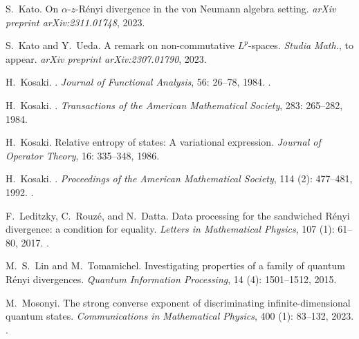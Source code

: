 \documentclass[12pt]{article}
\theoremstyle{definition}
\theoremstyle{remark}
\numberwithin{equation}{section}
\begin{document}
\begin{thebibliography}{27}
S.~Kato.
\newblock On $\alpha $-$ z $-{R}\'enyi divergence in the von {N}eumann algebra
  setting.
\newblock \emph{arXiv preprint arXiv:2311.01748}, 2023.

S.~Kato and Y.~Ueda.
\newblock A remark on non-commutative {$L^p$}-spaces.
\newblock \emph{Studia Math.}, to appear.
\newblock \emph{arXiv preprint arXiv:2307.01790}, 2023.

H.~Kosaki.
.
\newblock \emph{Journal of Functional Analysis}, {56}: 26--78,
  {1984}{}.
\newblock {}.

H.~Kosaki.
.
\newblock \emph{Transactions of the American Mathematical Society}, {283}: 265--282,
  {1984}{}.

H.~Kosaki.
\newblock Relative entropy of states: A variational expression.
\newblock \emph{Journal of Operator Theory}, 16: 335--348, 1986.

H.~Kosaki.
.
\newblock \emph{Proceedings of the American Mathematical Society}, 114
  (2): 477--481, 1992.
\newblock {}.

F.~Leditzky, C.~Rouz{\'e}, and N.~Datta.
\newblock Data processing for the sandwiched {R}{\'e}nyi divergence: a
  condition for equality.
\newblock \emph{Letters in Mathematical Physics}, 107 (1):
  61--80, 2017.
\newblock {}.

M.~S.~Lin and M.~Tomamichel.
\newblock Investigating properties of a family of quantum R\'enyi divergences.
\newblock \emph{Quantum Information Processing}, 14
 (4): 1501--1512, 2015.

M.~Mosonyi.
\newblock The strong converse exponent of discriminating infinite-dimensional
  quantum states.
\newblock \emph{Communications in Mathematical Physics}, 400
  (1): 83--132, 2023.
\newblock {}.


\end{thebibliography}
\end{document}
